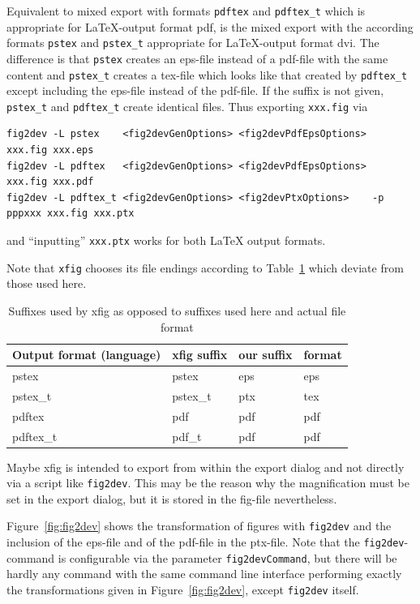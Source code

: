 \documentclass[12pt]{book}
\begin{document}
Equivalent to mixed export with formats \texttt{pdftex} and \texttt{pdftex\_t} 
which is appropriate for \LaTeX-output format pdf, 
is the mixed export with the according formats 
\texttt{pstex} and \texttt{pstex\_t} appropriate for \LaTeX-output format dvi. 
The difference is that \texttt{pstex} creates an eps-file instead of a pdf-file 
with the same content 
and \texttt{pstex\_t} creates a tex-file which looks like that 
created by \texttt{pdftex\_t} except including the eps-file 
instead of the pdf-file. 
If the suffix is not given, 
\texttt{pstex\_t} and \texttt{pdftex\_t} create identical files. 
Thus exporting \texttt{xxx.fig} via 
%
\begin{Verbatim}[fontsize=\scriptsize]
fig2dev -L pstex    <fig2devGenOptions> <fig2devPdfEpsOptions>           xxx.fig xxx.eps   
fig2dev -L pdftex   <fig2devGenOptions> <fig2devPdfEpsOptions>           xxx.fig xxx.pdf   
fig2dev -L pdftex_t <fig2devGenOptions> <fig2devPtxOptions>    -p pppxxx xxx.fig xxx.ptx
\end{Verbatim}
%
and ``inputting'' \texttt{xxx.ptx} works for both \LaTeX{} output formats. 


Note that \texttt{xfig} chooses its file endings 
according to Table~\ref {tab:xfigSuffixes} 
which deviate from those used here. 

\begin{longtable}{|l|lll|}
\hline
Output format (language) & xfig suffix & our suffix & format \\
\hline
\hline
\endfirsthead
\hline
\caption{\label{tab:xfigSuffixes} Suffixes used by xfig as opposed to suffixes
  used here and actual file format }
\endlastfoot
pstex                    & pstex       & eps        & eps \\
pstex\_t                 & pstex\_t    & ptx        & tex \\
pdftex                   & pdf         & pdf        & pdf \\
pdftex\_t                & pdf\_t      & pdf        & pdf \\
\end{longtable}


Maybe xfig is intended to export from within the export dialog 
and not directly via a script like \texttt{fig2dev}. 
This may be the reason 
why the magnification must be set in the export dialog, 
but it is stored in the fig-file nevertheless. 

Figure~\ref{fig:fig2dev} shows the transformation 
of figures with \texttt{fig2dev} 
and the inclusion of the eps-file and of the pdf-file in the ptx-file. 
Note that the \texttt{fig2dev}-command is configurable 
via the parameter \texttt{fig2devCommand}, 
but there will be hardly any command with the same command line interface 
performing exactly the transformations given in Figure~\ref{fig:fig2dev}, 
except \texttt{fig2dev} itself. 
\end{document}
